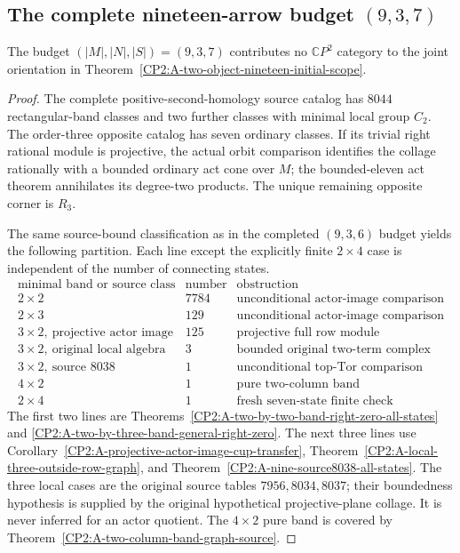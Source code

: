 \subsection{The complete nineteen-arrow budget \texorpdfstring{$(9,3,7)$}{(9,3,7)}}

\begin{theorem}
\label{CP2:A-oriented-nineteen-nine-three-seven}
The budget $(|M|,|N|,|S|)=(9,3,7)$ contributes no
$\mathbb CP^2$ category to the joint orientation in
Theorem~\ref{CP2:A-two-object-nineteen-initial-scope}.
\end{theorem}
\begin{proof}
The complete positive-second-homology source catalog has $8044$
rectangular-band classes and two further classes with minimal local
group $C_2$.  The order-three opposite catalog has seven ordinary
classes.  If its trivial right rational module is projective, the
actual orbit comparison identifies the collage rationally with a
bounded ordinary act cone over $M$; the bounded-eleven act theorem
annihilates its degree-two products.  The unique remaining opposite
corner is $R_3$.

The same source-bound classification as in the completed $(9,3,6)$
budget yields the following partition.  Each line except the explicitly
finite $2\times4$ case is independent of the number of connecting states.
\[
\begin{array}{c|r|l}
\text{minimal band or source class}&\text{number}&\text{obstruction}\\ \hline
2\times2&7784&\text{unconditional actor-image comparison}\\
2\times3&129&\text{unconditional actor-image comparison}\\
3\times2,\ \text{projective actor image}&125&
                    \text{projective full row module}\\
3\times2,\ \text{original local algebra}&3&
                    \text{bounded original two-term complex}\\
3\times2,\ \text{source }8038&1&
                    \text{unconditional top-Tor comparison}\\
4\times2&1&\text{pure two-column band}\\
2\times4&1&\text{fresh seven-state finite check}
\end{array}
\]
The first two lines are
Theorems~\ref{CP2:A-two-by-two-band-right-zero-all-states} and
\ref{CP2:A-two-by-three-band-general-right-zero}.
The next three lines use
Corollary~\ref{CP2:A-projective-actor-image-cup-transfer},
Theorem~\ref{CP2:A-local-three-outside-row-graph}, and
Theorem~\ref{CP2:A-nine-source8038-all-states}.
The three local cases are the original source tables
$7956,8034,8037$; their boundedness hypothesis is supplied by the
original hypothetical projective-plane collage.  It is never inferred
for an actor quotient.  The $4\times2$ pure band is covered by
Theorem~\ref{CP2:A-two-column-band-graph-source}.


\end{proof}
